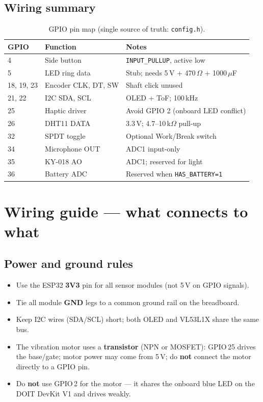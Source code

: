 \documentclass[11pt,a4paper]{report}
\newcommand{\filepath}[1]{\texttt{#1}}
\begin{document}
\section{Wiring summary}

\begin{table}[h]
\centering
\caption{GPIO pin map (single source of truth: \filepath{config.h}).}
\begin{tabular}{@{}lll@{}}
\toprule
\textbf{GPIO} & \textbf{Function} & \textbf{Notes} \\
\midrule
4  & Side button & \texttt{INPUT\_PULLUP}, active low \\
5  & LED ring data & Stub; needs 5\,V + 470\,$\Omega$ + 1000\,$\mu$F \\
18, 19, 23 & Encoder CLK, DT, SW & Shaft click unused \\
21, 22 & I2C SDA, SCL & OLED + ToF; 100\,kHz \\
25 & Haptic driver & Avoid GPIO 2 (onboard LED conflict) \\
26 & DHT11 DATA & 3.3\,V; 4.7--10\,k$\Omega$ pull-up \\
32 & SPDT toggle & Optional Work/Break switch \\
34 & Microphone OUT & ADC1 input-only \\
35 & KY-018 AO & ADC1; reserved for light \\
36 & Battery ADC & Reserved when \texttt{HAS\_BATTERY=1} \\
\bottomrule
\end{tabular}
\end{table}

\chapter{Wiring guide --- what connects to what}
\label{ch:wiring}

\section{Power and ground rules}

\begin{itemize}[leftmargin=*]
  \item Use the ESP32 \textbf{3V3} pin for all sensor modules (not 5\,V on GPIO signals).
  \item Tie all module \textbf{GND} legs to a common ground rail on the breadboard.
  \item Keep I2C wires (SDA/SCL) short; both OLED and VL53L1X share the same bus.
  \item The vibration motor uses a \textbf{transistor} (NPN or MOSFET): GPIO\,25 drives the
        base/gate; motor power may come from 5\,V; do \textbf{not} connect the motor directly
        to a GPIO pin.
  \item Do \textbf{not} use GPIO\,2 for the motor --- it shares the onboard blue LED on the
        DOIT DevKit V1 and drives weakly.
\end{itemize}
\end{document}

